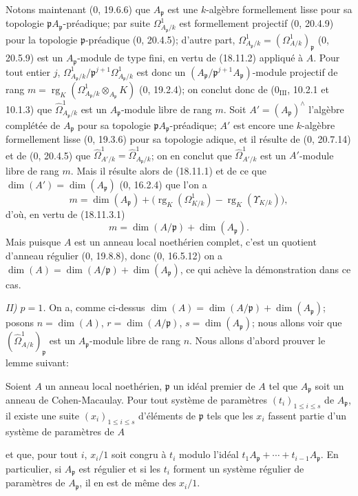 Notons maintenant (0, 19.6.6) que $A_{\mathfrak p}$ est une $k$-algèbre formellement lisse pour sa topologie $\mathfrak pA_{\mathfrak p}$-préadique; par suite $\Omega^1_{A_{\mathfrak p}/k}$ est formellement projectif (0, 20.4.9) pour la topologie $\mathfrak p$-préadique (0, 20.4.5); d'autre part, $\Omega^1_{A_{\mathfrak p}/k}=(\Omega^1_{A/k})_{\mathfrak p}$ (0, 20.5.9) est un $A_{\mathfrak p}$-module de type fini, en vertu de (18.11.2) appliqué à $A$. Pour tout entier $j$, $\Omega^1_{A_{\mathfrak p}/k}/\mathfrak p^{j+1}\Omega^1_{A_{\mathfrak p}/k}$ est donc un $(A_{\mathfrak p}/\mathfrak p^{j+1}A_{\mathfrak p})$-module projectif de rang $m=\operatorname{rg}_K(\Omega^1_{A_{\mathfrak p}/k}\otimes_{A_{\mathfrak p}}K)$ (0, 19.2.4); on conclut donc de ($0_{\mathrm{III}}$, 10.2.1 et 10.1.3) que $\hat{\Omega}^1_{A_{\mathfrak p}/k}$ est un $A_{\mathfrak p}$-module libre de rang $m$. Soit $A'=(A_{\mathfrak p})^\wedge$ l'algèbre complétée de $A_{\mathfrak p}$ pour sa topologie $\mathfrak pA_{\mathfrak p}$-préadique; $A'$ est encore une $k$-algèbre formellement lisse (0, 19.3.6) pour sa topologie adique, et il résulte de (0, 20.7.14) et de (0, 20.4.5) que $\hat{\Omega}^1_{A'/k}=\hat{\Omega}^1_{A_{\mathfrak p}/k}$; on en conclut que $\hat{\Omega}^1_{A'/k}$ est un $A'$-module libre de rang $m$. Mais il résulte alors de (18.11.1) et de ce que $\dim(A')=\dim(A_{\mathfrak p})$ (0, 16.2.4) que l'on a
\begin{equation}
\label{IV.18.11.3.2}
\tag{18.11.3.2}
  m=\dim(A_{\mathfrak p})+
  \bigl(\operatorname{rg}_K(\Omega^1_{K/k})-\operatorname{rg}_K(\Upsilon_{K/k})\bigr),
\end{equation}
d'où, en vertu de (18.11.3.1)
\[
  m=\dim(A/\mathfrak p)+\dim(A_{\mathfrak p}).
\]
Mais puisque $A$ est un anneau local noethérien complet, c'est un quotient d'anneau régulier (0, 19.8.8), donc (0, 16.5.12) on a $\dim(A)=\dim(A/\mathfrak p)+\dim(A_{\mathfrak p})$, ce qui achève la démonstration dans ce cas.

\emph{II) $p=1$.} On a, comme ci-dessus $\dim(A)=\dim(A/\mathfrak p)+\dim(A_{\mathfrak p})$; posons $n=\dim(A)$, $r=\dim(A/\mathfrak p)$, $s=\dim(A_{\mathfrak p})$; nous allons voir que $(\hat{\Omega}^1_{A/k})_{\mathfrak p}$ est un $A_{\mathfrak p}$-module libre de rang $n$. Nous allons d'abord prouver le lemme suivant:

\begin{lemma}[18.11.3.3]
\label{IV.18.11.3.3}
Soient $A$ un anneau local noethérien, $\mathfrak p$ un idéal premier de $A$ tel que $A_{\mathfrak p}$ soit un anneau de Cohen-Macaulay. Pour tout système de paramètres $(t_i)_{1\leq i\leq s}$ de $A_{\mathfrak p}$, il existe une suite $(x_i)_{1\leq i\leq s}$ d'éléments de $\mathfrak p$ tels que les $x_i$ fassent partie d'un système de paramètres de $A$


et que, pour tout $i$, $x_i/1$ soit congru à $t_i$ modulo l'idéal $t_1A_{\mathfrak p}+\cdots+t_{i-1}A_{\mathfrak p}$. En particulier, si $A_{\mathfrak p}$ est régulier et si les $t_i$ forment un système régulier de paramètres de $A_{\mathfrak p}$, il en est de même des $x_i/1$.
\end{lemma}

